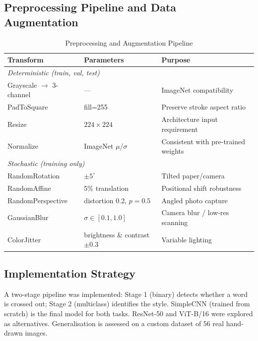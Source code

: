 \documentclass[12pt, a4paper]{article}
\begin{document}
\subsection{Preprocessing Pipeline and Data Augmentation}
\label{sec:preproc}

\begin{table}[H]
\centering
\caption{Preprocessing and Augmentation Pipeline}
\label{tab:preproc}
\begin{tabular}{lll}
\toprule
\textbf{Transform} & \textbf{Parameters} & \textbf{Purpose} \\ \midrule
\multicolumn{3}{l}{\textit{Deterministic (train, val, test)}} \\
Grayscale $\to$ 3-channel & — & ImageNet compatibility \\
PadToSquare & fill=255 & Preserve stroke aspect ratio \\
Resize & $224\times224$ & Architecture input requirement \\
Normalize & ImageNet $\mu$/$\sigma$ & Consistent with pre-trained weights \\ \midrule
\multicolumn{3}{l}{\textit{Stochastic (training only)}} \\
RandomRotation & $\pm5^\circ$ & Tilted paper/camera \\
RandomAffine & 5\% translation & Positional shift robustness \\
RandomPerspective & distortion 0.2, $p{=}0.5$ & Angled photo capture \\
GaussianBlur & $\sigma\in[0.1,1.0]$ & Camera blur / low-res scanning \\
ColorJitter & brightness \& contrast $\pm0.3$ & Variable lighting \\ \bottomrule
\end{tabular}
\end{table}

\subsection{Implementation Strategy}

A two-stage pipeline was implemented: Stage 1 (binary) detects whether a word is crossed out; Stage 2 (multiclass) identifies the style. SimpleCNN (trained from scratch) is the final model for both tasks. ResNet-50 and ViT-B/16 were explored as alternatives. Generalisation is assessed on a custom dataset of 56 real hand-drawn images.

\end{document}

